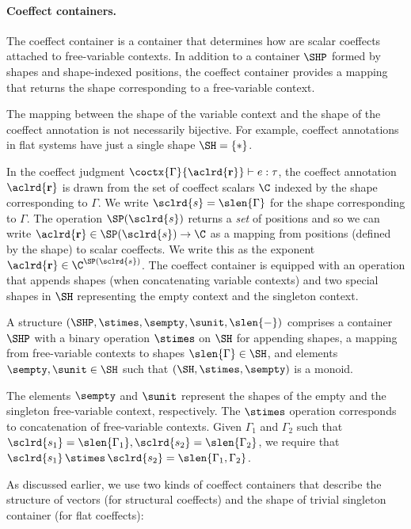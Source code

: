 \paragraph{Coeffect containers.}
The coeffect container is a container that determines how are scalar coeffects attached to
free-variable contexts. In addition to a container $\SHP$ formed by shapes and shape-indexed positions,
the coeffect container provides a mapping that returns the shape corresponding to a free-variable context.

The mapping between the shape of the variable context and the shape of the coeffect annotation
is not necessarily bijective. For example, coeffect annotations in flat systems have just a single
shape $\SH = \{ \ast \}$.

In the coeffect judgment $\coctx{\Gamma}{\aclrd{\textbf{r}}} \vdash e : \tau$, the coeffect annotation
$\aclrd{\textbf{r}}$ is drawn from the set of coeffect scalars $\C$ indexed by the shape corresponding
to $\Gamma$. We write $\sclrd{s} = \slen{\Gamma}$ for the shape corresponding to $\Gamma$. The operation
$\SP(\sclrd{s})$ returns a \emph{set} of positions and so we can write $\aclrd{\textbf{r}} \in
  \SP(\sclrd{s}) \rightarrow \C$  as a mapping from positions (defined by the shape) to scalar coeffects.
We write this as the exponent $\aclrd{\textbf{r}} \in \C^{\SP(\sclrd{s})}$.
The coeffect container is equipped with an operation that appends shapes (when concatenating
variable contexts) and two special shapes in $\SH$ representing the empty context and the singleton
context.

\begin{definition}
A \emph{} structure $(\SHP, \stimes, \sempty, \sunit, \slen{-})$
comprises a container $\SHP$ with a binary operation $\stimes$ on $\SH$ for appending shapes, a
mapping from free-variable contexts to shapes $\slen{\Gamma} \in \SH$, and elements $\sempty,\sunit \in
\SH$ such that $(\SH, \stimes, \sempty)$ is a monoid.

The elements $\sempty$ and $\sunit$ represent the shapes of the empty and the singleton free-variable
context, respectively. The $\stimes$ operation corresponds to concatenation of free-variable contexts.
Given $\Gamma_1$ and $\Gamma_2$ such that $\sclrd{s_1}=\slen{\Gamma_1}, \sclrd{s_2}=\slen{\Gamma_2}$,
we require that $\sclrd{s_1}\,\stimes\,\sclrd{s_2}=\slen{\Gamma_1, \Gamma_2}$.
\end{definition}

\noindent
As discussed earlier, we use two kinds of coeffect containers that describe the structure of vectors
(for structural coeffects) and the shape of trivial singleton container (for flat coeffects):

